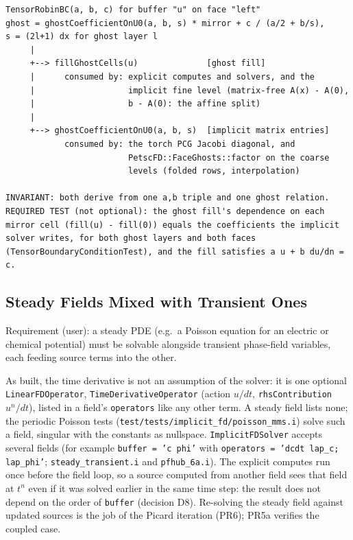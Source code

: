 \documentclass[11pt]{article}
\newenvironment{schematic}{%
  \begin{tcolorbox}[breakable, colback=codebg, colframe=gray!40, boxrule=0.4pt, arc=1mm, left=4mm, right=4mm, top=2mm, bottom=2mm]
  \ttfamily\footnotesize
}{%
  \end{tcolorbox}
}
\begin{document}
\begin{schematic}
\begin{verbatim}
TensorRobinBC(a, b, c) for buffer "u" on face "left"
ghost = ghostCoefficientOnU0(a, b, s) * mirror + c / (a/2 + b/s),
s = (2l+1) dx for ghost layer l
     |
     +--> fillGhostCells(u)              [ghost fill]
     |      consumed by: explicit computes and solvers, and the
     |                   implicit fine level (matrix-free A(x) - A(0),
     |                   b - A(0): the affine split)
     |
     +--> ghostCoefficientOnU0(a, b, s)  [implicit matrix entries]
            consumed by: the torch PCG Jacobi diagonal, and
                         PetscFD::FaceGhosts::factor on the coarse
                         levels (folded rows, interpolation)

INVARIANT: both derive from one a,b triple and one ghost relation.
REQUIRED TEST (not optional): the ghost fill's dependence on each
mirror cell (fill(u) - fill(0)) equals the coefficients the implicit
solver writes, for both ghost layers and both faces
(TensorBoundaryConditionTest), and the fill satisfies a u + b du/dn = c.
\end{verbatim}
\end{schematic}

\subsection{Steady Fields Mixed with Transient Ones}
\label{sec:steady-mixing}

Requirement (user): a steady PDE (e.g.\ a Poisson equation for an electric
or chemical potential) must be solvable alongside transient phase-field
variables, each feeding source terms into the other.

As built, the time derivative is not an assumption of the solver: it is one
optional \texttt{LinearFDOperator}, \texttt{TimeDerivativeOperator} (action
$u/dt$, \texttt{rhsContribution} $u^n/dt$), listed in a field's
\texttt{operators} like any other term. A steady field lists none; the
periodic Poisson tests (\texttt{test/tests/implicit\_fd/poisson\_mms.i}) solve
such a field, singular with the constants as nullspace. \texttt{ImplicitFDSolver}
accepts several fields (for example \texttt{buffer = 'c phi'} with
\texttt{operators = 'dcdt lap\_c; lap\_phi'}; \texttt{steady\_transient.i}
and \texttt{pfhub\_6a.i}). The explicit computes run once before the field loop, so a
source computed from another field sees that field at $t^n$ even if it was
solved earlier in the same time step: the result does not depend on the order
of \texttt{buffer} (decision D8). Re-solving the steady field against updated
sources is the job of the Picard iteration (PR6); PR5a verifies the coupled
case.
\end{document}
